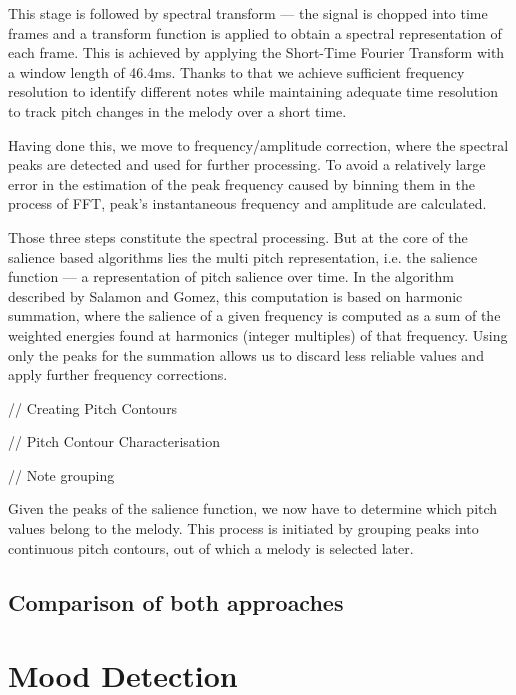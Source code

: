 This stage is followed by spectral transform — the signal is chopped into time frames and a transform function is applied to obtain a spectral representation of each frame. This is achieved by applying the Short-Time Fourier Transform with a window length of 46.4ms. Thanks to that we achieve sufficient frequency resolution to identify different notes while maintaining adequate time resolution to track pitch changes in the melody over a short time. 

Having done this, we move to frequency/amplitude correction, where the spectral peaks are detected and used for further processing. To avoid a relatively large error in the estimation of the peak frequency caused by binning them in the process of FFT, peak’s instantaneous frequency and amplitude are calculated. 

Those three steps constitute the spectral processing. But at the core of the salience based algorithms lies the multi pitch representation, i.e. the salience function — a representation of pitch salience over time. In the algorithm described by Salamon and Gomez, this computation is based on harmonic summation, where the salience of  a given frequency is computed as a sum of the weighted energies found at harmonics (integer multiples) of that frequency. Using only the peaks for the summation allows us to discard less reliable values and apply further frequency corrections. 


// Creating Pitch Contours

// Pitch Contour Characterisation

// Note grouping

Given the peaks of the salience function, we now have to determine which pitch values belong to the melody. This process is initiated by grouping peaks into continuous pitch contours, out of which a melody is selected later. 


\subsection{Comparison of both approaches}


\section{Mood Detection}
